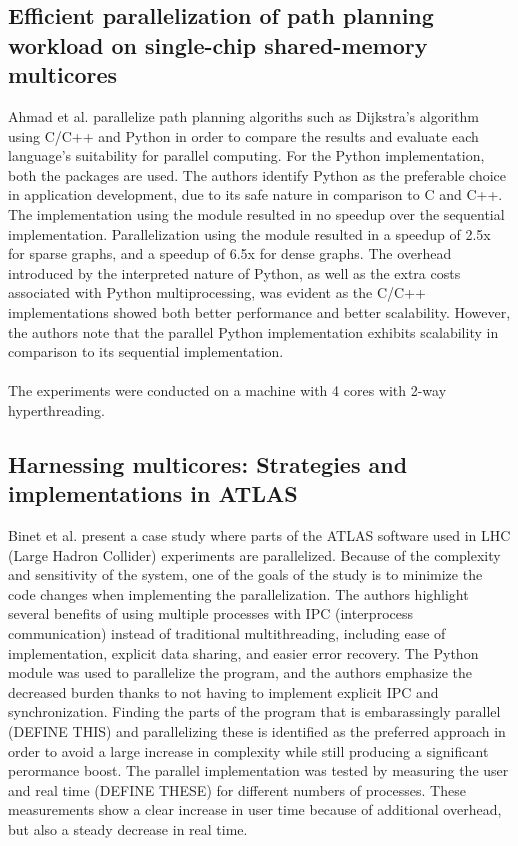 \subsection{Efficient parallelization of path planning workload on single-chip shared-memory multicores}
Ahmad et al. \cite{ahmad_2015_efficient_epoppwossm} parallelize path planning algoriths such as Dijkstra's algorithm using C/C++ and
Python in order to compare the results and evaluate each language's suitability for parallel computing. For the Python implementation,
both the   packages are used. The authors identify Python as the preferable choice 
in application development, due to its safe nature in comparison to C and C++. The implementation using the 
module resulted in no speedup over the sequential implementation. Parallelization using the  module resulted
in a speedup of 2.5x for sparse graphs, and a speedup of 6.5x for dense graphs. The overhead introduced by the interpreted nature
of Python, as well as the extra costs associated with Python multiprocessing, was evident as the C/C++ implementations showed both
better performance and better scalability. However, the authors note that the parallel Python implementation exhibits scalability
in comparison to its sequential implementation.
\\\\
The experiments were conducted on a machine with 4 cores with 2-way hyperthreading.


\subsection{Harnessing multicores: Strategies and implementations in ATLAS}
Binet et al. \cite{binet_2010_harnessing_hmsaiia} present a case study where parts of the ATLAS software used in
LHC (Large Hadron Collider) experiments are parallelized. Because of the complexity and sensitivity of the system,
one of the goals of the study is to minimize the code changes when implementing the parallelization. The authors highlight several
benefits of using multiple processes with IPC (interprocess communication) instead of traditional multithreading, including ease of 
implementation, explicit data sharing, and easier error recovery. The Python  module was used to parallelize
the program, and the authors emphasize the decreased burden thanks to not having to implement explicit IPC and synchronization.
Finding the parts of the program that is embarassingly parallel (DEFINE THIS) and parallelizing these is
identified as the preferred approach in order to avoid a large increase in complexity while still producing a significant perormance boost.
The parallel implementation was tested by measuring the user and real time (DEFINE THESE) for different numbers of processes.
These measurements show a clear increase in user time because of additional overhead, but also a steady decrease in real time.

